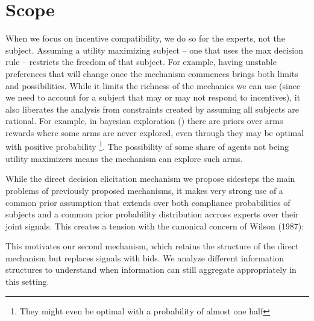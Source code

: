 \section{Scope}

When we focus on incentive compatibility, we do so for the experts, not the subject.
Assuming a utility maximizing subject -- one that uses the max decision rule -- restricts the freedom of that subject.
For example, having unstable preferences that will change once the mechanism commences brings both limits and possibilities.
While it limits the richness of the mechanics we can use (since we need to account for a subject that may or may not respond to incentives), it also liberates the analysis from constraints created by assuming all subjects are rational.
For example, in bayesian  exploration (\cite{mansour2015bayesian}) there are priors over arms rewards where some arms are never explored, even through they may be optimal with positive probability \footnote{They might even be optimal with a probability of almost one half}. The possibility of some share of agents not being utility maximizers means the mechanism can explore such arms.

While the direct decision elicitation mechanism we propose sidesteps the main problems of previously proposed mechanisms, it makes very strong use of a common prior assumption that extends over both compliance probabilities of subjects and a common prior probability distribution accross experts over their joint signals. This creates a tension with the canonical concern of Wilson (1987):


This motivates our second mechanism, which retains the structure of the direct mechanism but replaces signals with bids. We analyze different information structures to understand when information can still aggregate appropriately in this setting.

